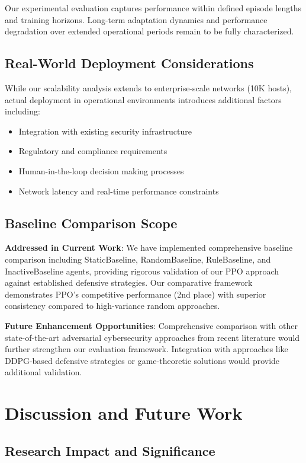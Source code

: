 \documentclass[12pt,twoside]{article}
\begin{document}
Our experimental evaluation captures performance within defined episode lengths and training horizons. Long-term adaptation dynamics and performance degradation over extended operational periods remain to be fully characterized.

\subsection{Real-World Deployment Considerations}

While our scalability analysis extends to enterprise-scale networks (10K hosts), actual deployment in operational environments introduces additional factors including:
\begin{itemize}
\item Integration with existing security infrastructure
\item Regulatory and compliance requirements
\item Human-in-the-loop decision making processes
\item Network latency and real-time performance constraints
\end{itemize}

\subsection{Baseline Comparison Scope}

\textbf{Addressed in Current Work}: We have implemented comprehensive baseline comparison including StaticBaseline, RandomBaseline, RuleBaseline, and InactiveBaseline agents, providing rigorous validation of our PPO approach against established defensive strategies. Our comparative framework demonstrates PPO's competitive performance (2nd place) with superior consistency compared to high-variance random approaches.

\textbf{Future Enhancement Opportunities}: Comprehensive comparison with other state-of-the-art adversarial cybersecurity approaches from recent literature would further strengthen our evaluation framework. Integration with approaches like DDPG-based defensive strategies or game-theoretic solutions would provide additional validation.

\section{Discussion and Future Work}

\subsection{Research Impact and Significance}
\end{document}
